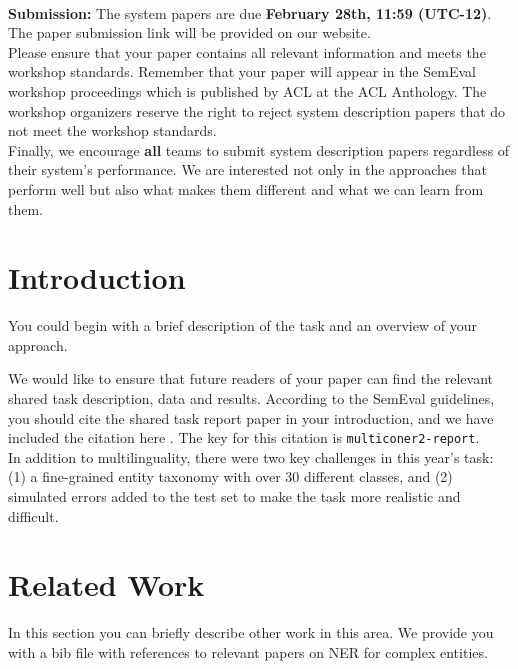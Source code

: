 \documentclass[11pt]{article}
\begin{document}
\\

{\bf Submission:} The system papers are due {\bf February 28th, 11:59 (UTC-12)}. The paper submission link will be provided on our website.
\\


Please ensure that your paper contains all relevant information and meets the workshop standards. Remember that your paper will appear in the SemEval workshop proceedings which is published by ACL at the ACL Anthology. The workshop organizers reserve the right to reject system description papers that do not meet the workshop standards.\\

Finally, we encourage {\bf all} teams to submit system description papers regardless of their system's performance. We are interested not only in the approaches that perform well but also what makes them different and what we can learn from them.\\

\section{Introduction}
\label{intro}

You could begin with a brief description of the task and an overview of your approach. 

We would like to ensure that future readers of your paper can find the relevant shared task description, data and results. According to the SemEval guidelines, you should cite the shared task report paper in your introduction, and we have included the citation here \cite{multiconer2-report}. The key for this citation is \texttt{multiconer2-report}.
\\

In addition to multilinguality, there were two key challenges in this year's task: (1) a fine-grained entity taxonomy with over 30 different classes, and (2) simulated errors added to the test set to make the task more realistic and difficult.

\section{Related Work}

In this section you can briefly describe other work in this area.
We provide you with a bib file with references to relevant papers on NER for complex entities.
\\
\end{document}
